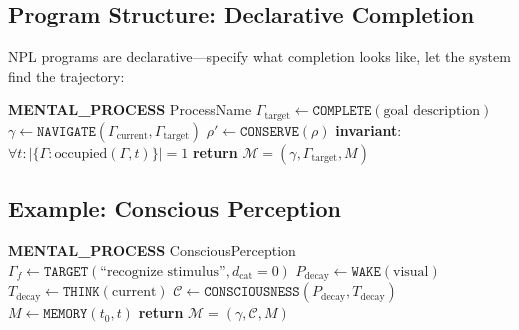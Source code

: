 \documentclass[aps,prd,twocolumn,superscriptaddress,floatfix,nofootinbib]{revtex4-2}
\theoremstyle{remark}
\newcommand{\Ccat}{\mathcal{C}}
\newcommand{\Gstate}{\Gamma}
\newcommand{\Pdecay}{P_{\mathrm{decay}}}
\newcommand{\Tdecay}{T_{\mathrm{decay}}}
\newcommand{\Mstate}{\mathcal{M}}
\begin{document}
\subsection{Program Structure: Declarative Completion}

NPL programs are declarative---specify what completion looks like, let the system find the trajectory:

\begin{algorithm}
\caption{NPL Program Structure}
\label{alg:npl_structure}
\begin{algorithmic}[1]
\State \textbf{MENTAL\_PROCESS} ProcessName
\State
\State {}
\State $\Gstate_{\text{target}} \gets \texttt{COMPLETE}(\text{goal description})$
\State
\State {}
\State $\gamma \gets \texttt{NAVIGATE}(\Gstate_{\text{current}}, \Gstate_{\text{target}})$
\State
\State {}
\State $\rho' \gets \texttt{CONSERVE}(\rho)$
\State
\State {}
\State \textbf{invariant}: $\forall t: |\{\Gstate : \text{occupied}(\Gstate, t)\}| = 1$
\State
\State {}
\State \textbf{return} $\Mstate = (\gamma, \Gstate_{\text{target}}, M)$
\end{algorithmic}
\end{algorithm}

\subsection{Example: Conscious Perception}

\begin{algorithm}
\caption{Conscious Perception in NPL}
\label{alg:consciousness}
\begin{algorithmic}[1]
\State \textbf{MENTAL\_PROCESS} ConsciousPerception
\State
\State {}
\State $\Gstate_f \gets \texttt{TARGET}(\text{``recognize stimulus''}, d_{\text{cat}} = 0)$
\State
\State {}
\State $\Pdecay \gets \texttt{WAKE}(\text{visual})$
\State $\Tdecay \gets \texttt{THINK}(\text{current})$
\State
\State {}
\State $\Ccat \gets \texttt{CONSCIOUSNESS}(\Pdecay, \Tdecay)$
\State
\State {}
\State $M \gets \texttt{MEMORY}(t_0, t)$
\State
\State {}
\State \textbf{return} $\Mstate = (\gamma, \Ccat, M)$
\end{algorithmic}
\end{algorithm}
\end{document}
